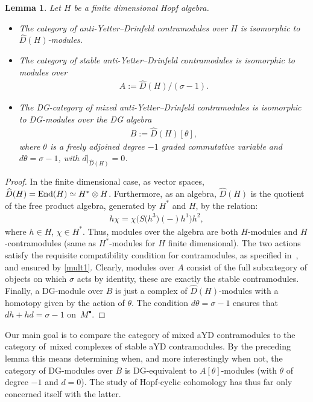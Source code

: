 \documentclass[10pt,a4paper]{amsart}
\numberwithin{equation}{section}
\newtheorem{Lemma}[Theorem]{Lemma}
\newcommand{\ot}{\otimes}
\begin{document}
\begin{Lemma}\label{bas}
Let $H$ be a finite dimensional Hopf algebra.
\begin{itemize}\itemsep=0pt
\item The category of anti-Yetter--Drinfeld contramodules over $H$ is isomorphic to $\widehat{D}(H)$-mo\-dules.

\item The category of stable anti-Yetter--Drinfeld contramodules is isomorphic to modules over
\begin{gather}
A:=\widehat{D}(H)/(\sigma-1).
\end{gather}

\item The DG-category of mixed anti-Yetter--Drinfeld contramodules is isomorphic to DG-mo\-dules over the DG algebra
\begin{gather}
B:=\widehat{D}(H)[\theta],
\end{gather}
where $\theta$ is a freely adjoined degree $-1$ graded commutative variable and $d\theta=\sigma-1$, with $d|_{\widehat{D}(H)}=0$.
\end{itemize}
\end{Lemma}
\begin{proof}
In the finite dimensional case, as vector spaces, $\widehat{D}(H)={\rm End}(H)\simeq H^*\ot H$. Furthermore, as an algebra, $\widehat{D}(H)$ is the quotient of the free product algebra, generated by $H^*$ and $H$, by the relation:
\begin{gather}
\label{mult1}
h \chi= \chi\big(S\big(h^3\big)(-)h^1\big)h^2,
\end{gather}
where $h\in H$, $\chi\in H^*$. Thus, modules over the algebra are both $H$-modules and $H$-cont\-ra\-mo\-du\-les (same as $H^*$-modules for $H$ finite dimensional). The two actions satisfy the requisite compatibility condition for contramodules, as specified in~\cite{contra}, and ensured by \eqref{mult1}. Clearly, modules over $A$ consist of the full subcategory of objects on which $\sigma$ acts by identity, these are exactly the stable contramodules. Finally, a DG-module over $B$ is just a complex of $\widehat{D}(H)$-modules with a homotopy given by the action of $\theta$. The condition $d\theta=\sigma-1$ ensures that $dh+hd=\sigma-1$ on~$M^\bullet$.
\end{proof}

Our main goal is to compare the category of mixed
aYD contramodules to the category of~mixed complexes of stable aYD
contramodules. By the preceding lemma this means determining when,
and more interestingly when not, the category of DG-modules over $B$ is DG-equivalent to $A[\theta]$-modules (with $\theta$ of degree $-1$ and $d=0$). The study of Hopf-cyclic cohomology has thus far only concerned itself with the latter.
\end{document}
